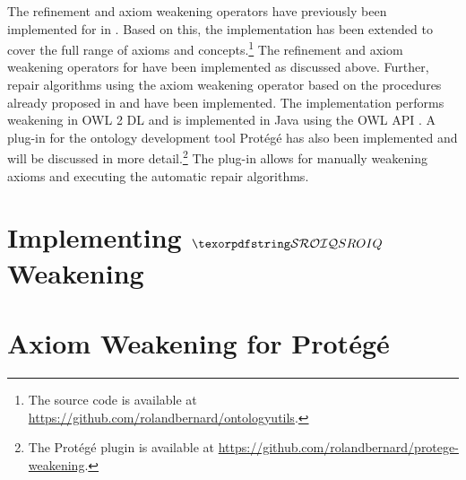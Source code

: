 
The refinement and axiom weakening operators have previously been implemented for \ALC in \cite{troquard2018repairing}. Based on this, the implementation has been extended to cover the full range of \SROIQ axioms and concepts.\footnote{The source code is available at \url{https://github.com/rolandbernard/ontologyutils}.} The refinement and axiom weakening operators for \SROIQ have been implemented as discussed above. Further, repair algorithms using the axiom weakening operator based on the procedures already proposed in \cite{troquard2018repairing} and \cite{confalonieri2020towards} have been implemented. The implementation performs weakening in OWL 2 DL \cite{motik2012ontology} and is implemented in Java using the OWL API \cite{horridge2011owl,owlapi,matentzoglu2016introduction}. A plug-in for the ontology development tool Protégé has also been implemented and will be discussed in more detail.\footnote{The Protégé plugin is available at \url{https://github.com/rolandbernard/protege-weakening}.} The plug-in allows for manually weakening axioms and executing the automatic repair algorithms.

\section{Implementing \texorpdfstring{$\SROIQ$}{SROIQ} Weakening}\label{prototype}



\section{Axiom Weakening for Protégé}\label{protege}


